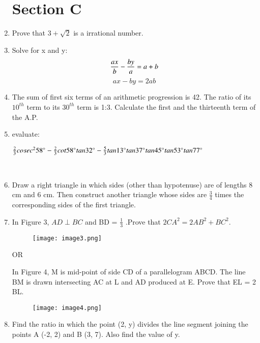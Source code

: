 \documentclass[journal,12pt,twocolumn]{IEEEtran}
\begin{document}
\begin{enumerate}
\section{\textbf{Section C}}
\item Prove that $3+\sqrt{2}$ is a irrational number.\\
\item Solve for x and y:
\begin{equation}
     \frac{ax}{b}- \frac{by}{a} = a+b\\ \nonumber
\end{equation}
\begin{equation}
    ax-by = 2ab \nonumber
\end{equation}
\item The sum of first six terms of an arithmetic progression is 42. The ratio of its $10^{th}$ term to its $30^{th}$ term is 1:3. Calculate the first and the thirteenth term of the A.P.\\
\item evaluate:
\begin{center}
    $\frac{2}{3}cosec^2 58\degree - \frac{2}{3}cot58\degree tan32\degree - \frac{5}{3}tan13\degree tan37\degree tan45\degree tan53\degree tan77\degree $
\end{center}
\\ 
\item Draw a right triangle in which sides (other than hypotenuse) are of lengths 8 cm and 6 cm. Then construct another triangle whose sides are $\frac{3}{4}$ times the corresponding sides of the first triangle.\\
\item In  Figure 3,  $AD \perp BC$ and BD = $\frac{1}{3}$ .Prove that $2CA^2 =2AB^2+BC^2$.
\begin{figure}[h!]
    \centering
    \texttt{[image: image3.png]}
 \end{figure}
\begin{center}
    OR
\end{center}
 In  Figure  4,  M  is  mid-point  of  side  CD  of  a  parallelogram  ABCD. The line BM  is  drawn  
intersecting  AC  at L  and AD  produced  at E. Prove that  EL  = 2 BL.
\begin{figure}[h!]
    \centering
    \texttt{[image: image4.png]}
 \end{figure}
\item Find the ratio in which the point (2, y) divides the line segment joining the points A (-2, 2) and B (3, 7). Also find the value of y. \\

\end{enumerate}
\end{document}
